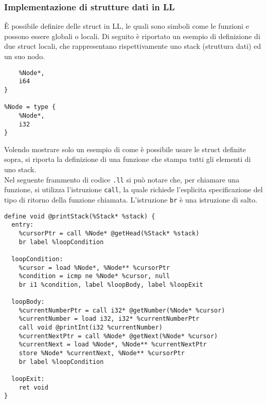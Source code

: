 \subsubsection{Implementazione di strutture dati in LL}
È possibile definire delle struct in LL, le quali sono simboli come le funzioni e possono essere 
globali o locali. Di seguito è riportato un esempio di definizione di due struct locali, che rappresentano 
rispettivamente uno stack (struttura dati) ed un suo nodo. \\

\vspace{0.5cm}
\begin{lstlisting}[frame=single]
%Stack = type { 
    %Node*, 
    i64 
}

%Node = type { 
    %Node*, 
    i32 
}
\end{lstlisting}
\vspace{0.5cm}

Volendo mostrare solo un esempio di come è possibile usare le struct definite sopra,
si riporta la definizione di una funzione che stampa tutti gli elementi di uno stack. \\

Nel seguente frammento di codice \texttt{.ll} si può notare che, per chiamare una funzione, 
si utilizza l'istruzione \texttt{call}, la quale richiede l'esplicita specificazione del tipo
di ritorno della funzione chiamata. L'istruzione \texttt{br} è una istruzione di salto. \\

\vspace{0.5cm}
\begin{lstlisting}[frame=single]
define void @printStack(%Stack* %stack) {
  entry:
    %cursorPtr = call %Node* @getHead(%Stack* %stack)
    br label %loopCondition

  loopCondition:
    %cursor = load %Node*, %Node** %cursorPtr    
    %condition = icmp ne %Node* %cursor, null
    br i1 %condition, label %loopBody, label %loopExit

  loopBody:
    %currentNumberPtr = call i32* @getNumber(%Node* %cursor)
    %currentNumber = load i32, i32* %currentNumberPtr
    call void @printInt(i32 %currentNumber) 
    %currentNextPtr = call %Node* @getNext(%Node* %cursor)
    %currentNext = load %Node*, %Node** %currentNextPtr
    store %Node* %currentNext, %Node** %cursorPtr
    br label %loopCondition

  loopExit:
    ret void
}
\end{lstlisting}
\vspace{0.5cm}